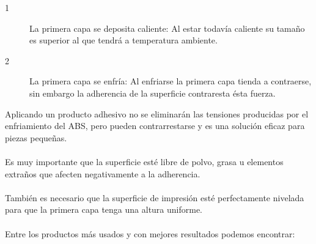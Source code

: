 \documentclass[11pt,a4paper]{article}
\begin{document}
\begin{description}
\item[1] La primera capa se deposita caliente: Al estar todavía caliente su tamaño es superior al que tendrá a temperatura ambiente.
\item[2] La primera capa se enfría: Al enfriarse la primera capa tienda a contraerse, sin embargo la adherencia de la superficie contraresta ésta fuerza.
\end{description}
Aplicando un producto adhesivo no se eliminarán las tensiones producidas por el enfriamiento del ABS, pero pueden contrarrestarse y es una solución eficaz para piezas pequeñas.
\\\\
Es muy importante que la superficie esté libre de polvo, grasa u elementos extraños que afecten negativamente a la adherencia.
\\\\
También es necesario que la superficie de impresión esté perfectamente nivelada para que la primera capa tenga una altura uniforme.
\\\\
Entre los productos más usados y con mejores resultados podemos encontrar:
\end{document}
